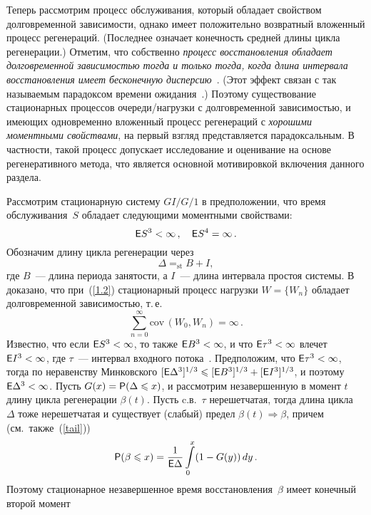 \begin{multicols}{2}
Теперь рассмотрим процесс обслуживания, который обладает свойством
долговременной зависимости, однако имеет положительно возвратный
вложенный процесс регенераций. (Последнее означает конечность
средней длины цикла регенерации.) Отметим, что собственно {\it
процесс вос\-ста\-нов\-ления обладает долговременной зависимостью тогда и
только тогда, когда длина интервала восстановления имеет
бесконечную дисперсию}~\cite {Daley}. (Этот эффект связан с так
называемым парадоксом времени ожидания~\cite {Feller}.) Поэтому
существование стационарных процессов очереди/нагрузки с долговременной зависимостью, и имеющих одновременно вложенный
процесс регенераций с {\it хорошими моментными свойствами}, на
первый взгляд представляется парадоксальным. В частности, такой
процесс допускает исследование и оценивание на основе регенеративного метода, что является основной мотивировкой включения
данного раздела.

Рассмотрим стационарную систему $GI/G/1$ в предположении, что время
обслуживания~$S$ обладает следующими моментными свойствами:
\begin{equation}
{\sf E} S ^3<\infty\,,\quad {\sf E} S ^4=\infty\,.
\label{1.2}
\end{equation}
 Обозначим длину цикла регенерации через
$$\Delta=_{\mathrm{st}}B+I,$$
где $B$~--- длина периода занятости, а $I$~--- длина интервала
простоя системы. В~\cite{Daley68} доказано, что при~(\ref{1.2})
стационарный процесс нагрузки $W=\{W_n\}$ обладает долговременной\linebreak
зависи\-мостью, т.\,е.\
\begin{equation}
\sum\limits _{n=0}^\infty \mathrm{cov}\,\left ( W_0,W_n\right )=\infty\,.
\label{lrd}
\end{equation}
Известно, что если ${\sf E} S ^3<\infty$, то также ${\sf E} B^3<\infty$, и
что ${\sf E} \tau^3<\infty$ влечет ${\sf E} I^3<\infty$, где $\tau$~--- интервал
 входного потока~\cite {Wolff}.
 Предположим, что ${\sf E}\tau^3<\infty$, тогда по неравенству
Минковского $[{\sf E} \Delta^3]^{1/3}\leqslant [{\sf E} B^3]^{1/3}+[{\sf E} I^3]^{1/3}$, и
поэтому ${\sf E} \Delta^3<\infty$. Пусть $G(x)={\sf P}(\Delta\leqslant x)$, и
рассмотрим незавершенную в момент $t$ длину цикла регенерации $
\beta(t).$ Пусть c.в.~$\tau$ нерешетчатая, тогда длина цикла~$\Delta$ тоже нерешетчатая и существует (слабый) предел
$\beta(t)\Rightarrow \beta $, причем~\cite{Asmus} (см.\ также~(\ref{tail}))
\begin{equation*}
 {\sf P} (\beta\leqslant x)=\displaystyle\frac{\displaystyle 1\mathstrut}{\displaystyle {\sf E} \Delta\mathstrut} \int\limits_0^x (1-G(y))\,dy\,.
 \label{73}
\end{equation*}
Поэтому стационарное незавершенное время восстановления~$\beta$
имеет конечный второй момент
\vspace*{-4pt}


\end{multicols}
